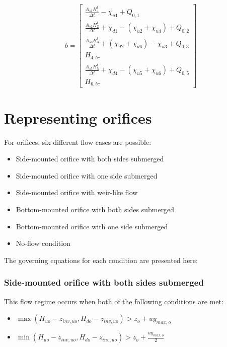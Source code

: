 \documentclass[11pt]{article}
\begin{document}
\begin{equation}
  b = 
  \begin{bmatrix}
    \frac{A_{s1} H_1^t}{\Delta t} - \chi_{u1} + Q_{0,1} \\
    \frac{A_{s2} H_2^t}{\Delta t} + \chi_{d1} - (\chi_{u2} + \chi_{u4}) + Q_{0,2} \\
    \frac{A_{s3} H_3^t}{\Delta t} + (\chi_{d2} + \chi_{d6}) - \chi_{u3} + Q_{0,3} \\
    H_{4,bc} \\
    \frac{A_{s5} H_5^t}{\Delta t} + \chi_{d4} - (\chi_{u5} + \chi_{u6}) + Q_{0,5} \\
    H_{6,bc}
  \end{bmatrix}
\end{equation}

\section{Representing orifices}

For orifices, six different flow cases are possible:

\begin{itemize}
\item Side-mounted orifice with both sides submerged
\item Side-mounted orifice with one side submerged
\item Side-mounted orifice with weir-like flow
\item Bottom-mounted orifice with both sides submerged
\item Bottom-mounted orifice with one side submerged
\item No-flow condition
\end{itemize}

The governing equations for each condition are presented here:

\subsubsection*{Side-mounted orifice with both sides submerged}

This flow regime occurs when both of the following conditions are met:

\begin{itemize}
\item $\max(H_{uo} - z_{inv,uo}, H_{do} - z_{inv,uo}) > z_o + u y_{max,o}$
\item $\min(H_{uo} - z_{inv,uo}, H_{do} - z_{inv,uo}) > z_o + \frac{u y_{max,o}}{2}$
\end{itemize}
\end{document}
